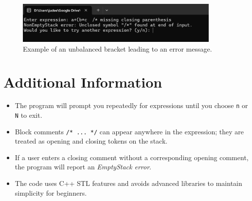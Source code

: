 \documentclass[12pt]{article}
\begin{document}
		\begin{figure}[ht]
			\centering
			\includegraphics[width=0.9\textwidth]{images/Screenshot_2025-02-17_205741.png}
			\caption{Example of an unbalanced bracket leading to an error message.}
			\label{fig:run-unbalanced}
		\end{figure}
		
		\section{Additional Information}
		\begin{itemize}
			\item The program will prompt you repeatedly for expressions until you choose \texttt{n} or \texttt{N} to exit.
			\item Block comments \texttt{/* ... */} can appear anywhere in the expression; they are treated as opening and closing tokens on the stack.
			\item If a user enters a closing comment without a corresponding opening comment, the program will report an \textit{EmptyStack error}.
			\item The code uses C++ STL features and avoids advanced libraries to maintain simplicity for beginners.
		\end{itemize}
		
	
\end{document}
